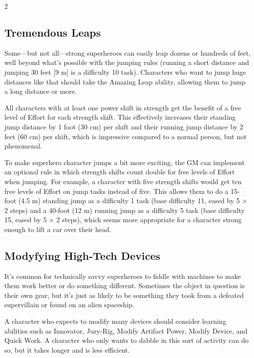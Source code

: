 \begin{multicols}{2}

\subsection{Tremendous Leaps}

Some—but not all—strong superheroes can easily leap dozens or hundreds of feet, well beyond what’s possible with the jumping rules (running a short distance and jumping 30 feet [9 m] is a difficulty 10 task). Characters who want to jump huge distances like that should take the Amazing Leap ability, allowing them to jump a long distance or more.

All characters with at least one power shift in strength get the benefit of a free level of Effort for each strength shift. This effectively increases their standing jump distance by 1 foot (30 cm) per shift and their running jump distance by 2 feet (60 cm) per shift, which is impressive compared to a normal person, but not phenomenal.

To make superhero character jumps a bit more exciting, the GM can implement an optional rule in which strength shifts count double for free levels of Effort when jumping. For example, a character with five strength shifts would get ten free levels of Effort on jump tasks instead of five. This allows them to do a 15-foot (4.5 m) standing jump as a difficulty 1 task (base difficulty 11, eased by 5 × 2 steps) and a 40-foot (12 m) running jump as a difficulty 5 task (base difficulty 15, eased by 5 × 2 steps), which seems more appropriate for a character strong enough to lift a car over their head.

\subsection{Modyfying High-Tech Devices}

It’s common for technically savvy superheroes to fiddle with machines to make them work better or do something different. Sometimes the object in question is their own gear, but it’s just as likely to be something they took from a defeated supervillain or found on an alien spaceship.

A character who expects to modify many devices should consider learning abilities such as Innovator, Jury-Rig, Modify Artifact Power, Modify Device, and Quick Work. 
A character who only wants to dabble in this sort of activity can do so, but it takes longer and is less efficient.


\end{multicols}
